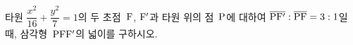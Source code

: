 타원 $\dfrac{x^2}{16}+\dfrac{y^2}{7}=1$의 두 초점~$\mathrm{F}$, $\mathrm{F}'$과 타원 위의 점~$\mathrm{P}$에 대하여 $\overline{\mathrm{PF'}}:\overline{\mathrm{PF}}=3:1$일 때, 삼각형~$\mathrm{PFF'}$의 넓이를 구하시오.
